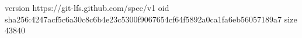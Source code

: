 version https://git-lfs.github.com/spec/v1
oid sha256:4247acf5c6a30c8c6b4e23c5300f9067654cf64f5892a0ca1fa6eb56057189a7
size 43840
